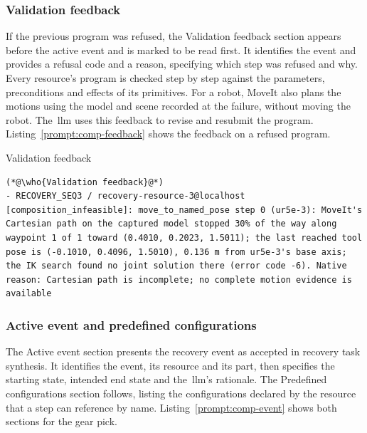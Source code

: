 \subsubsection{Validation feedback}\label{sec:comp-feedback}

If the previous program was refused, the Validation feedback section appears before the active
event and is marked to be read first. It identifies the event and provides a refusal code and a
reason, specifying which step was refused and why. Every resource's program is checked step by
step against the parameters, preconditions and effects of its primitives. For a robot, MoveIt also
plans the motions using the model and scene recorded at the failure, without moving the robot.
The~\gls{llm} uses this feedback to revise and resubmit the program. Listing~\ref{prompt:comp-feedback}
shows the feedback on a refused program.

\begin{recbox}{Validation feedback}
\begin{lstlisting}
(*@\who{Validation feedback}@*)
- RECOVERY_SEQ3 / recovery-resource-3@localhost [composition_infeasible]: move_to_named_pose step 0 (ur5e-3): MoveIt's Cartesian path on the captured model stopped 30% of the way along waypoint 1 of 1 toward (0.4010, 0.2023, 1.5011); the last reached tool pose is (-0.1010, 0.4096, 1.5010), 0.136 m from ur5e-3's base axis; the IK search found no joint solution there (error code -6). Native reason: Cartesian path is incomplete; no complete motion evidence is available
\end{lstlisting}
\end{recbox}

\subsubsection{Active event and predefined configurations}\label{sec:comp-event}

The Active event section presents the recovery event as accepted in recovery task synthesis.
It identifies the event, its resource and its part, then specifies the starting state, intended
end state and the~\gls{llm}'s rationale. The Predefined configurations section follows,
listing the configurations declared by the resource that a step can reference by name.
Listing~\ref{prompt:comp-event} shows both sections for the gear pick.

